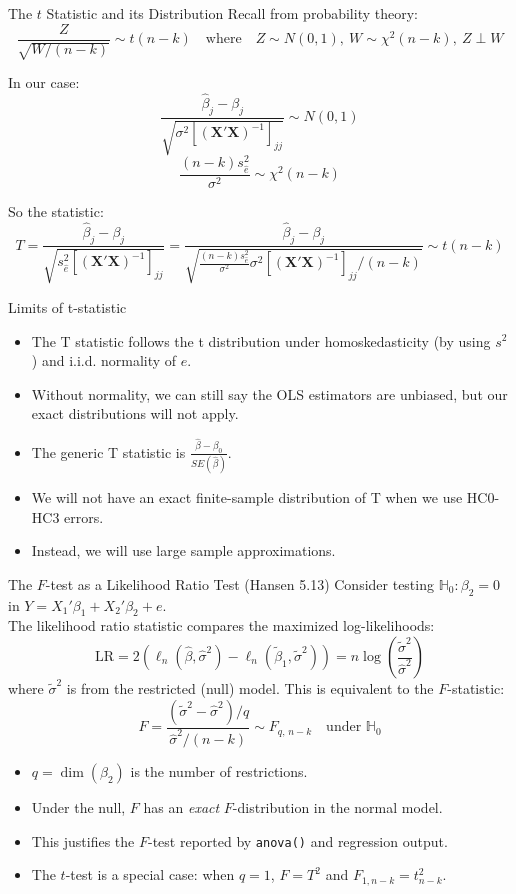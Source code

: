 \documentclass[aspectratio=169, handout, t]{beamer}
\numberwithin{equation}{section}
\begin{document}
\begin{frame}{The $t$ Statistic and its Distribution}
Recall from probability theory:
\[
\frac{Z}{\sqrt{W/(n - k)}} \sim t(n - k)
\quad \text{where} \quad Z \sim N(0, 1),\ W \sim \chi^2(n - k),\ Z \perp W
\]

In our case:
\[
\frac{\hat{\beta}_j - \beta_j}{\sqrt{\sigma^2 \left[(\bm{X'X})^{-1}\right]_{jj}}} \sim N(0, 1)
\]
\[
\frac{(n - k) s_{\hat{e}}^2}{\sigma^2} \sim \chi^2(n - k)
\]

So the statistic:
\[
T = \frac{\hat{\beta}_j - \beta_j}{\sqrt{s_{\hat{e}}^2 \left[(\bm{X'X})^{-1}\right]_{jj}}}= \frac{\hat{\beta}_j - \beta_j}{\sqrt{\frac{(n-k)s_{\hat{e}}^2}{\sigma^2} \sigma^2\left[(\bm{X'X})^{-1}\right]_{jj}/(n-k)}}
\sim t(n - k)
\]
\end{frame}


\begin{frame}{Limits of t-statistic}
\begin{itemize}
\item The T statistic follows the t distribution under homoskedasticity (by using $s^2$) and i.i.d. normality of $e$.
\item Without normality, we can still say the OLS estimators are unbiased, but our exact distributions will not apply.
\item The generic T statistic is $\frac{\hat{\beta}-\beta_0}{SE(\hat{\beta})}$.
\item We will not have an exact finite-sample distribution of T when we use HC0-HC3 errors.
\item Instead, we will use large sample approximations.
\end{itemize}
\end{frame}

\begin{frame}{The $F$-test as a Likelihood Ratio Test (Hansen 5.13)}
Consider testing $\mathbb{H}_0: \beta_2=0$ in $Y=X_1'\beta_1+X_2'\beta_2+e$.\\
The likelihood ratio statistic compares the maximized log-likelihoods:
$$\text{LR}=2\left(\ell_n(\hat{\beta},\hat{\sigma}^2)-\ell_n(\tilde{\beta}_1,\tilde{\sigma}^2)\right)=n\log\!\left(\frac{\tilde{\sigma}^2}{\hat{\sigma}^2}\right)$$\pause
where $\tilde{\sigma}^2$ is from the restricted (null) model.  This is equivalent to the $F$-statistic:
$$F=\frac{(\tilde{\sigma}^2-\hat{\sigma}^2)/q}{\hat{\sigma}^2/(n-k)}\sim F_{q,\, n-k}\quad\text{under }\mathbb{H}_0$$\pause
\begin{itemize}
\item $q=\dim(\beta_2)$ is the number of restrictions.
\item Under the null, $F$ has an \emph{exact} $F$-distribution in the normal model.
\item This justifies the $F$-test reported by \texttt{anova()} and regression output.\pause
\item The $t$-test is a special case: when $q=1$, $F=T^2$ and $F_{1,n-k}=t_{n-k}^2$.
\end{itemize}
\end{frame}
\end{document}
